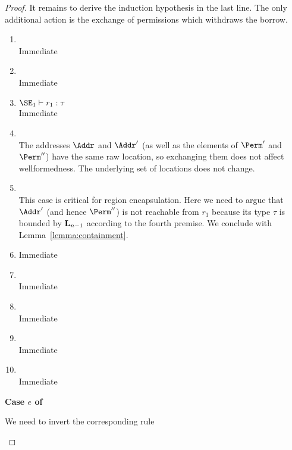 \begin{proof}
  It remains to derive the induction hypothesis in the last line. The
  only additional action is the exchange of permissions which
  withdraws the borrow.
  \begin{enumerate}[({R}1)]
  \item {}\\
    Immediate
  \item {}\\
    Immediate
  \item $\SE_1 \vdash r_1 : \tau$\\
    Immediate
  \item {} \\
    The addresses $\Addr$ and $\Addr'$ (as well as the elements of
    $\Perm'$ and $\Perm''$) have the same raw location, so
    exchanging them does not affect wellformedness. The underlying set
    of locations does not change.
  \item {} \\
    This case is critical for region encapsulation. Here we need to
    argue that $\Addr'$ (and hence $\Perm''$) is not reachable from $r_1$ because its type
    $\tau$ is bounded by $\klin_{n-1}$ according to the fourth
    premise. We conclude with Lemma~\ref{lemma:containment}.
  \item {}
    Immediate
  \item {} \\
    Immediate
  \item {} \\
    Immediate
  \item {} \\
    Immediate
  \item {} \\
    Immediate
  \end{enumerate}

  \newpage{}
  \textbf{Case $e$ of}

  We need to invert the corresponding rule
  \begin{mathpar}
  \end{mathpar}


\end{proof}
